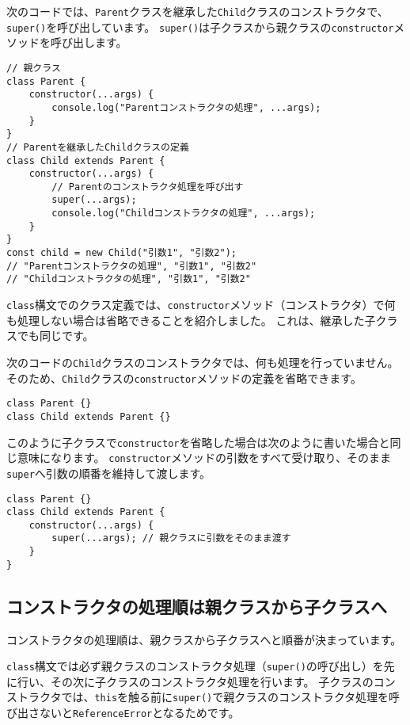 次のコードでは、\texttt{Parent}クラスを継承した\texttt{Child}クラスのコンストラクタで、\texttt{super()}を呼び出しています。
\texttt{super()}は子クラスから親クラスの\texttt{constructor}メソッドを呼び出します。

\begin{lstlisting}
// 親クラス
class Parent {
    constructor(...args) {
        console.log("Parentコンストラクタの処理", ...args);
    }
}
// Parentを継承したChildクラスの定義
class Child extends Parent {
    constructor(...args) {
        // Parentのコンストラクタ処理を呼び出す
        super(...args);
        console.log("Childコンストラクタの処理", ...args);
    }
}
const child = new Child("引数1", "引数2");
// "Parentコンストラクタの処理", "引数1", "引数2"
// "Childコンストラクタの処理", "引数1", "引数2"
\end{lstlisting}

\texttt{class}構文でのクラス定義では、\texttt{constructor}メソッド（コンストラクタ）で何も処理しない場合は省略できることを紹介しました。
これは、継承した子クラスでも同じです。

次のコードの\texttt{Child}クラスのコンストラクタでは、何も処理を行っていません。
そのため、\texttt{Child}クラスの\texttt{constructor}メソッドの定義を省略できます。

\begin{lstlisting}
class Parent {}
class Child extends Parent {}
\end{lstlisting}

このように子クラスで\texttt{constructor}を省略した場合は次のように書いた場合と同じ意味になります。
\texttt{constructor}メソッドの引数をすべて受け取り、そのまま\texttt{super}へ引数の順番を維持して渡します。

\begin{lstlisting}
class Parent {}
class Child extends Parent {
    constructor(...args) {
        super(...args); // 親クラスに引数をそのまま渡す
    }
}
\end{lstlisting}

\hypertarget{constructor-order}{%
\subsection{コンストラクタの処理順は親クラスから子クラスへ}\label{constructor-order}}

コンストラクタの処理順は、親クラスから子クラスへと順番が決まっています。

\texttt{class}構文では必ず親クラスのコンストラクタ処理（\texttt{super()}の呼び出し）を先に行い、その次に子クラスのコンストラクタ処理を行います。
子クラスのコンストラクタでは、\texttt{this}を触る前に\texttt{super()}で親クラスのコンストラクタ処理を呼び出さないと\texttt{ReferenceError}となるためです。

